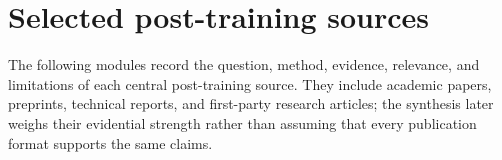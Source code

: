 \section{Selected post-training sources}

The following modules record the question, method, evidence, relevance, and limitations
of each central post-training source. They include academic papers, preprints, technical
reports, and first-party research articles; the synthesis later weighs their evidential
strength rather than assuming that every publication format supports the same claims.










